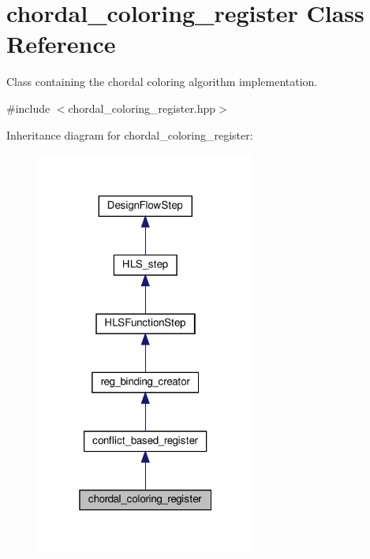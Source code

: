 \hypertarget{classchordal__coloring__register}{}\section{chordal\+\_\+coloring\+\_\+register Class Reference}
\label{classchordal__coloring__register}


Class containing the chordal coloring algorithm implementation.  




{\ttfamily \#include $<$chordal\+\_\+coloring\+\_\+register.\+hpp$>$}



Inheritance diagram for chordal\+\_\+coloring\+\_\+register\+:
\nopagebreak
\begin{figure}[H]
\begin{center}
\leavevmode
\includegraphics[width=205pt]{d8/dfd/classchordal__coloring__register__inherit__graph}
\end{center}
\end{figure}


